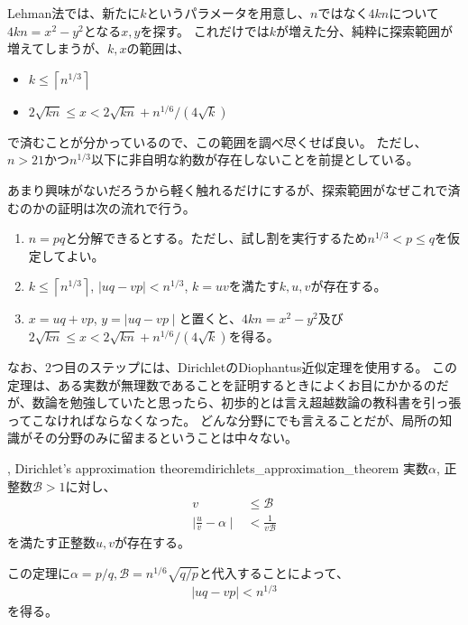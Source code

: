 Lehman法では、新たに$k$というパラメータを用意し、$n$ではなく$4kn$について$4kn=x^2-y^2$となる$x,y$を探す。
これだけでは$k$が増えた分、純粋に探索範囲が増えてしまうが、$k,x$の範囲は、
\begin{itemize}
\item $k \le \left \lceil n^{1/3}\right \rceil$
\item $2\sqrt{kn}\le x < 2\sqrt{kn}+n^{1/6}/(4\sqrt{k})$
\end{itemize}
で済むことが分かっているので、この範囲を調べ尽くせば良い。
ただし、$n>21$かつ$n^{1/3}$以下に非自明な約数が存在しないことを前提としている。


あまり興味がないだろうから軽く触れるだけにするが、探索範囲がなぜこれで済むのかの証明は次の流れで行う。
\begin{enumerate}
 \item $n=pq$と分解できるとする。ただし、試し割を実行するため$n^{1/3}<p\le q$を仮定してよい。
 \item $k \le \left \lceil n^{1/3}\right \rceil$, $\mid uq - vp \mid < n^{1/3}$, $k = uv$を満たす$k, u, v$が存在する。
 \item $x = uq + vp$, $y = \mid uq - vp \mid$と置くと、$4kn=x^2-y^2$及び$2\sqrt{kn}\le x < 2\sqrt{kn}+n^{1/6}/(4\sqrt{k})$を得る。
\end{enumerate}

なお、2つ目のステップには、DirichletのDiophantus近似定理を使用する。
この定理は、ある実数が無理数であることを証明するときによくお目にかかるのだが、数論を勉強していたと思ったら、初歩的とは言え超越数論の教科書を引っ張ってこなければならなくなった。
どんな分野にでも言えることだが、局所の知識がその分野のみに留まるということは中々ない。

\begin{Theo}{, Dirichlet's approximation theorem}{dirichlets_approximation_theorem}
実数$\alpha$, 正整数$\mathcal{B}>1$に対し、
\begin{align*}
v &\le \mathcal{B}\\
\mid \frac{u}{v} - \alpha \mid &< \frac{1}{v\mathcal{B}}
\end{align*}
を満たす正整数$u,v$が存在する。
\end{Theo}

この定理に$\alpha=p/q,\mathcal{B}=n^{1/6}\sqrt{q/p}$と代入することによって、
\begin{align*}
\mid uq - vp \mid < n^{1/3}
\end{align*}
を得る。

